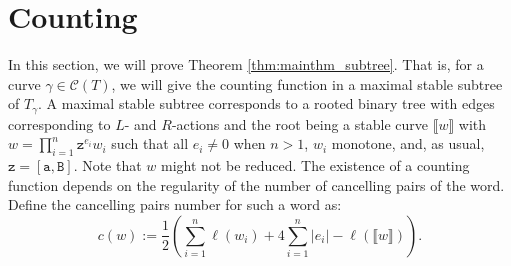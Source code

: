 \documentclass{article}
\begin{document}
	
	
	\section{Counting}
	
	In this section, we will prove Theorem \ref{thm:mainthm_subtree}. That is, for a curve $\gamma\in\mathcal{C}(T)$, we will give the counting function in a maximal stable subtree of $T_\gamma$. A maximal stable subtree corresponds to a rooted binary tree with edges corresponding to $L$- and $R$-actions and the root being a stable curve $\llbracket  w \rrbracket$ with $w=\prod_{i=1}^n\mathtt{z}^{e_i}w_i$ such that all $e_i\neq0$ when $n>1$, $w_i$ monotone, and, as usual, $\mathtt{z}=[\mathtt{a},\mathtt{B}]$. Note that $w$ might not be reduced. The existence of a counting function depends on the regularity of the number of cancelling pairs of the word. Define the cancelling pairs number for such a word as: 
	\[
	c(w):=\frac{1}{2}\left(\sum_{i=1}^n\ell(w_i)+4\sum_{i=1}^n |e_i|-\ell(\llbracket w\rrbracket)\right).
	\]
	
\end{document}
